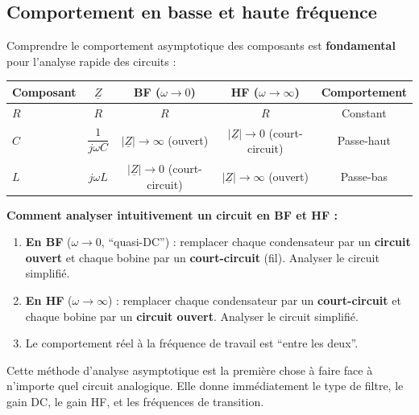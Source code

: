 \documentclass[12pt,a4paper,twoside]{book}
\begin{document}
\subsection{Comportement en basse et haute fréquence}

Comprendre le comportement asymptotique des composants est \textbf{fondamental} pour l'analyse rapide des circuits :

\begin{formule}
\begin{center}
\renewcommand{\arraystretch}{1.8}
\begin{tabular}{lcccc}
\toprule
\textbf{Composant} & $\underline{Z}$ & \textbf{BF} ($\omega \to 0$) & \textbf{HF} ($\omega \to \infty$) & \textbf{Comportement} \\
\midrule
$R$ & $R$ & $R$ & $R$ & Constant \\
$C$ & $\dfrac{1}{j\omega C}$ & $|\underline{Z}| \to \infty$ (ouvert) & $|\underline{Z}| \to 0$ (court-circuit) & Passe-haut \\[6pt]
$L$ & $j\omega L$ & $|\underline{Z}| \to 0$ (court-circuit) & $|\underline{Z}| \to \infty$ (ouvert) & Passe-bas \\
\bottomrule
\end{tabular}
\end{center}
\end{formule}

\begin{intuition}
\textbf{Comment analyser intuitivement un circuit en BF et HF :}
\begin{enumerate}[nosep]
\item \textbf{En BF} ($\omega \to 0$, ``quasi-DC'') : remplacer chaque condensateur par un \textbf{circuit ouvert} et chaque bobine par un \textbf{court-circuit} (fil). Analyser le circuit simplifié.
\item \textbf{En HF} ($\omega \to \infty$) : remplacer chaque condensateur par un \textbf{court-circuit} et chaque bobine par un \textbf{circuit ouvert}. Analyser le circuit simplifié.
\item Le comportement réel à la fréquence de travail est ``entre les deux''.
\end{enumerate}
Cette méthode d'analyse asymptotique est la première chose à faire face à n'importe quel circuit analogique. Elle donne immédiatement le type de filtre, le gain DC, le gain HF, et les fréquences de transition.
\end{intuition}
\end{document}
